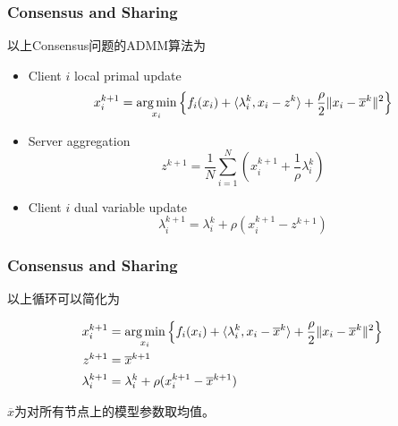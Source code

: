 
\begin{frame}
\frametitle{Consensus and Sharing}

以上Consensus问题的ADMM算法为

\vspace{0.8em}

\begin{itemize}
    \item Client $i$ local primal update
    $$x^{k+1}_i = \operatorname*{arg\,min}\limits_{x_i} \left\{ f_i(x_i) + \langle \lambda_i^k, x_i-z^k \rangle + \dfrac{\rho}{2}\lVert x_i-\overline{x}^k \rVert^2 \right\}$$
    \item Server aggregation
    $$z^{k+1} = \dfrac{1}{N}\sum\limits_{i=1}^N (x^{k+1}_i + \dfrac{1}{\rho} \lambda^{k}_i)$$
    \item Client $i$ dual variable update
    $$\lambda_i^{k+1} = \lambda_i^k + \rho(x^{k+1}_i-z^{k+1})$$
\end{itemize}
\end{frame}


\begin{frame}
\frametitle{Consensus and Sharing}

以上循环可以简化为

\vspace{0.3em}

\begin{align*}
x^{k+1}_i & = \operatorname*{arg\,min}\limits_{x_i} \left\{ f_i(x_i) + \langle \lambda_i^k, x_i-\overline{x}^k \rangle + \dfrac{\rho}{2}\lVert x_i-\overline{x}^k \rVert^2 \right\} \\
z^{k+1} & = \overline{x}^{k+1} \\
\lambda_i^{k+1} & = \lambda_i^k + \rho(x^{k+1}_i-\overline{x}^{k+1})
\end{align*}

\vspace{0.5em}

$\overline{x}$为对所有节点上的模型参数取均值。


\end{frame}


